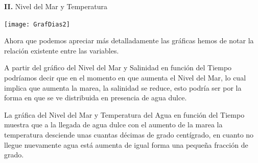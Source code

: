 \textbf{II.} Nivel del Mar y Temperatura
\begin{center}
\texttt{[image: GrafDias2]}
\end{center}

Ahora que podemos apreciar más detalladamente las gráficas hemos de notar la relación existente entre las variables.

A partir del gráfico del Nivel del Mar y Salinidad en función del Tiempo podríamos decir que en el momento en que aumenta el Nivel del Mar, lo cual implica que aumenta la marea, la salinidad se reduce, esto podría ser por la forma en que se ve distribuida en presencia de agua dulce.

La gráfica del Nivel del Mar y Temperatura del Agua en función del Tiempo muestra que a la llegada de agua dulce con el aumento de la marea la temperatura desciende unas cuantas décimas de grado centígrado, en cuanto no llegue nuevamente agua está aumenta de igual forma una pequeña fracción de grado.

